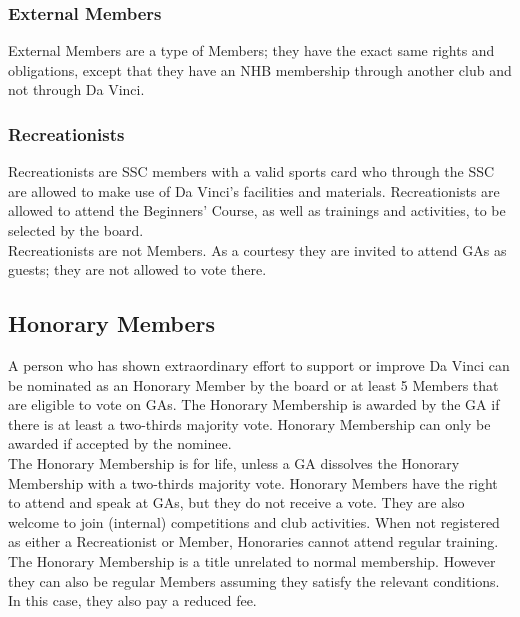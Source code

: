 \documentclass[a4paper]{article}
\begin{document}
\subsubsection{External Members}
{ External Members} are a type of { Members}; they have the exact same rights and obligations, except that they have an { NHB} membership through another club and not through Da Vinci.

\subsubsection{Recreationists}
{ Recreationists} are { SSC} members with a valid sports card who through the { SSC} are allowed to make use of Da Vinci's facilities and materials. { Recreationists} are allowed to attend the { Beginners' Course}, as well as trainings and activities, to be selected by the board. \\

{ Recreationists} are not { Members}. As a courtesy they are invited to attend { GA}s as guests; they are not allowed to vote there.

\subsection{Honorary Members}
A person who has shown extraordinary effort to support or improve Da Vinci can be nominated as an { Honorary Member} by the board or at least 5 { Members} that are eligible to vote on { GA}s.
The { Honorary Membership} is awarded by the { GA} if there is at least a two-thirds majority vote. { Honorary Membership} can only be awarded if accepted by the nominee. \\

The { Honorary Membership} is for life, unless a { GA} dissolves the { Honorary Membership} with a two-thirds majority vote. { Honorary Members} have the right to attend and speak at { GA}s, but they do not receive a vote. They are also welcome to join (internal) competitions and club activities. When not registered as either a { Recreationist} or { Member}, { Honoraries} cannot attend regular training. \\

The { Honorary Membership} is a title unrelated to normal membership. However they can also be regular { Members} assuming they satisfy the relevant conditions. In this case, they also pay a reduced fee.
\end{document}
